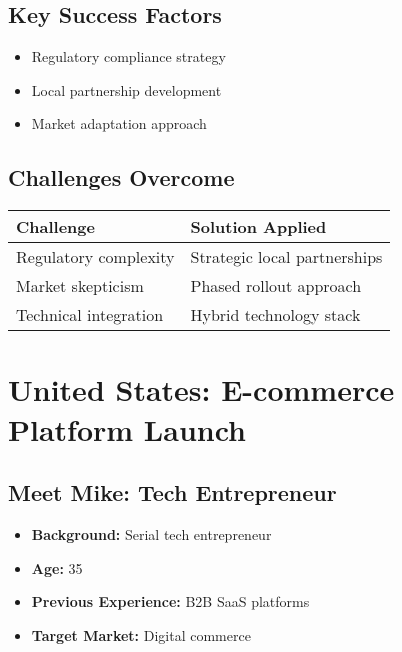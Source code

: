 \subsection{Key Success Factors}
\begin{itemize}
    \item Regulatory compliance strategy
    \item Local partnership development
    \item Market adaptation approach
\end{itemize}

\subsection{Challenges Overcome}
\begin{center}
\begin{tabular}{p{}|p{}}
    \textbf{Challenge} & \textbf{Solution Applied} \\
    \hline
    Regulatory complexity & Strategic local partnerships \\
    Market skepticism & Phased rollout approach \\
    Technical integration & Hybrid technology stack \\
\end{tabular}
\end{center}

\section{United States: E-commerce Platform Launch}

\subsection{Meet Mike: Tech Entrepreneur}
\begin{tcolorbox}[colback=white,colframe=primarydark,title=\textbf{Entrepreneur Profile}]
\begin{itemize}
    \item \textbf{Background:} Serial tech entrepreneur
    \item \textbf{Age:} 35
    \item \textbf{Previous Experience:} B2B SaaS platforms
    \item \textbf{Target Market:} Digital commerce
\end{itemize}
\end{tcolorbox}

